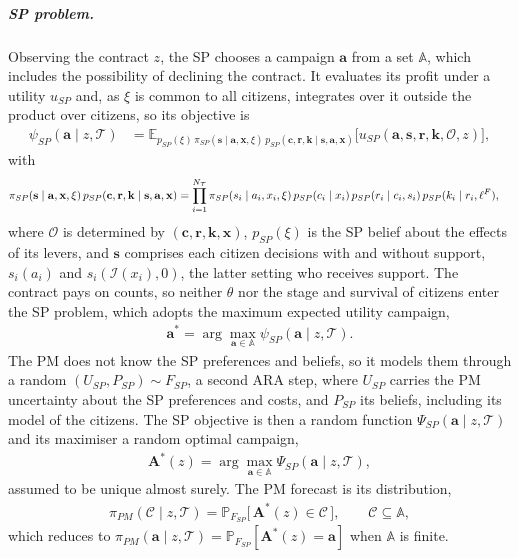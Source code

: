 \documentclass[12pt]{article}
\begin{document}
\subparagraph{SP problem.}
Observing the contract $z$, the SP chooses a campaign $\mathbf{a}$ from a set
$\mathbb{A}$, which includes the possibility of declining the contract.
It evaluates its profit under a utility $u_{SP}$ and, as $\xi$ is common to all citizens, integrates over it outside the product over citizens, so its objective is
\begin{align}\label{eq:sp_util}
  \psi_{SP}(\mathbf{a} \mid z, \mathcal{T})
  &= \mathbb{E}_{p_{SP}(\xi)\, \pi_{SP}(\mathbf{s} \mid \mathbf{a}, \mathbf{x}, \xi)\, p_{SP}(\mathbf{c}, \mathbf{r}, \mathbf{k} \mid \mathbf{s}, \mathbf{a}, \mathbf{x})}
     \big[ u_{SP}( \mathbf{a}, \mathbf{s}, \mathbf{r}, \mathbf{k}, \mathcal{O}, z ) \big],
\end{align}
with
\begin{align} 
  \pi_{SP}(\mathbf{s} \mid \mathbf{a}, \mathbf{x}, \xi)\, p_{SP}(\mathbf{c}, \mathbf{r}, \mathbf{k} \mid \mathbf{s}, \mathbf{a}, \mathbf{x})
  &= \prod_{i = 1}^{N_{\mathcal{T}}} \pi_{SP}(s_i \mid a_i, x_i, \xi)\, p_{SP}(c_i \mid x_i)\, p_{SP}(r_i \mid c_i, s_i)\, p_{SP}(k_i \mid r_i, \ell^F), \notag
\end{align}
where $\mathcal{O}$ is determined by $(\mathbf{c}, \mathbf{r}, \mathbf{k}, \mathbf{x})$, $p_{SP}(\xi)$ is the SP belief about the effects of its levers, and $\mathbf{s}$ comprises each citizen decisions with and without support, $s_i(a_i)$ and $s_i(\mathcal{I}(x_i), 0)$, the latter setting who receives support.
The contract pays on counts, so neither $\theta$ nor the stage and survival of
citizens enter the SP problem, which adopts the maximum expected
utility campaign,
\begin{align}\label{eq:sp_argmax}
  \mathbf{a}^{*} = \arg\max_{\mathbf{a} \in \mathbb{A}}
    \psi_{SP}(\mathbf{a} \mid z, \mathcal{T}).
\end{align}
The PM does not know the SP preferences and beliefs, so it models them through a random $(U_{SP}, P_{SP}) \sim F_{SP}$, a second ARA step, where $U_{SP}$ carries the PM uncertainty about the SP preferences and costs, and $P_{SP}$ its beliefs, including its model of the citizens. The SP
objective is then a random function $\Psi_{SP}(\mathbf{a} \mid z, \mathcal{T})$
and its maximiser a random optimal campaign,
\begin{align}
  \mathbf{A}^{*}(z) = \arg\max_{\mathbf{a} \in \mathbb{A}}
    \Psi_{SP}(\mathbf{a} \mid z, \mathcal{T}),
\end{align}
assumed to be unique almost surely. The PM forecast is its distribution,
\begin{align} \label{eq:sp_forecast}
    \pi_{PM}(\mathcal{C} \mid z, \mathcal{T})
    = \mathbb{P}_{F_{SP}}\big[\, \mathbf{A}^{*}(z) \in \mathcal{C} \,\big],
    \qquad \mathcal{C} \subseteq \mathbb{A},
\end{align}
which reduces to
$\pi_{PM}(\mathbf{a} \mid z, \mathcal{T}) =
\mathbb{P}_{F_{SP}}[\mathbf{A}^{*}(z) = \mathbf{a}]$ when $\mathbb{A}$ is
finite.
\end{document}
